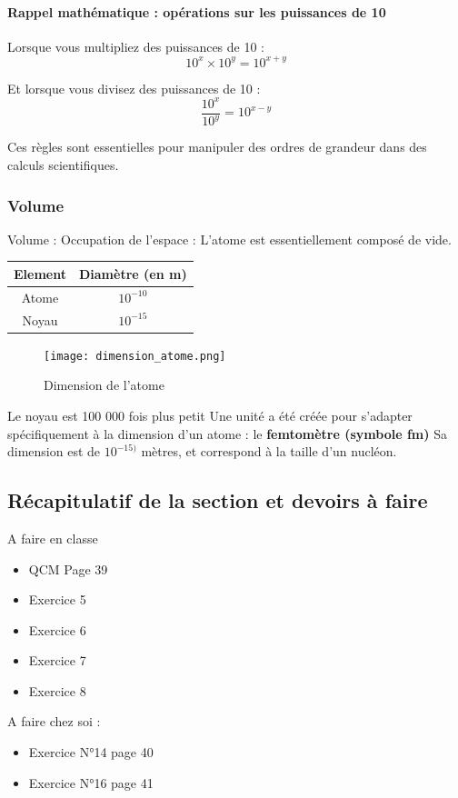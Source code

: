 \documentclass[a4paper,12pt]{article}
\begin{document}
\paragraph{Rappel mathématique : opérations sur les puissances de 10}

Lorsque vous multipliez des puissances de 10 :
\[
10^x \times 10^y = 10^{x + y}
\]

Et lorsque vous divisez des puissances de 10 :
\[
\frac{10^x}{10^y} = 10^{x - y}
\]

Ces règles sont essentielles pour manipuler des ordres de grandeur dans des calculs scientifiques.

\subsubsection{Volume}

Volume : Occupation de l'espace : L'atome est essentiellement composé de vide. 

\vspace{1em}

\begin{tabular}{SS}
  \toprule
  {Element} & {Diamètre (en \si{m})} \\
  \midrule
  {Atome} & {\(10^{-10}\)} \\
  {Noyau} & {\(10^{-15}\)} \\
  \bottomrule
\end{tabular}


\begin{figure}[H]
  \centering
  \texttt{[image: dimension\_atome.png]}
  \caption{\label{} Dimension de l'atome}
\end{figure}

Le noyau est 100 000 fois plus petit
Une unité a été créée pour s'adapter spécifiquement à la dimension d'un atome : le \textbf{femtomètre (symbole fm)}
Sa dimension est de \(10^{-15)}\) mètres, et correspond à la taille d'un nucléon.


\subsection{Récapitulatif de la section et devoirs à faire}

\begin{tcolorbox}[colback=blue!10!white, colframe=blue!75!black, title=Exemples - Application]
  A faire en classe 
  \begin{itemize}[noitemsep]
    \item QCM Page 39
    \item Exercice 5
    \item Exercice 6
    \item Exercice 7
    \item Exercice 8
  \end{itemize}

  A faire chez soi :
  \begin{itemize}[noitemsep]
    \item Exercice N°14 page 40
    \item Exercice N°16 page 41
  \end{itemize}
\end{tcolorbox}
\end{document}
